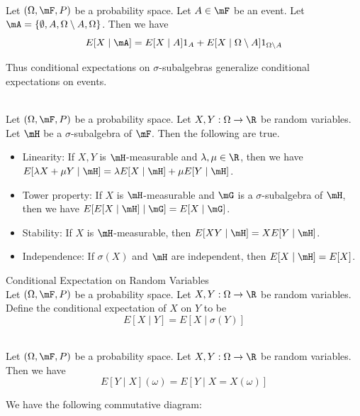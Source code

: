 \documentclass[a4paper]{article}
\begin{document}
\begin{lmm}{}{}\\
Let $(\Omega,\mF,P)$ be a probability space. Let $A\in\mF$ be an event. Let $\mA=\{\emptyset,A,\Omega\setminus A,\Omega\}$. Then we have $$E[X\;|\;\mA]=E[X\;|\;A]1_A+E[X\;|\;\Omega\setminus A]1_{\Omega\setminus A}$$
\end{lmm}

Thus conditional expectations on $\sigma$-subalgebras generalize conditional expectations on events. 

\begin{lmm}{}{}\\
Let $(\Omega,\mF,P)$ be a probability space. Let $X,Y:\Omega\to\R$ be random variables. Let $\mH$ be a $\sigma$-subalgebra of $\mF$. Then the following are true. 
\begin{itemize}
\item Linearity: If $X,Y$ is $\mH$-measurable and $\lambda,\mu\in\R$, then we have $E[\lambda X+\mu Y\;|\;\mH]=\lambda E[X\;|\;\mH]+\mu E[Y\;|\;\mH]$. 
\item Tower property: If $X$ is $\mH$-measurable and $\mG$ is a $\sigma$-subalgebra of $\mH$, then we have $E[E[X\;|\;\mH]\;|\;\mG]=E[X\;|\;\mG]$. 
\item Stability: If $X$ is $\mH$-measurable, then $E[XY\;|\;\mH]=XE[Y\;|\;\mH]$. 
\item Independence: If $\sigma(X)$ and $\mH$ are independent, then $E[X\;|\;\mH]=E[X]$. 
\end{itemize}
\end{lmm}

\begin{defn}{Conditional Expectation on Random Variables}{}\\
Let $(\Omega,\mF,P)$ be a probability space. Let $X,Y:\Omega\to\R$ be random variables. Define the conditional expectation of $X$ on $Y$ to be $$E[X\;|\;Y]=E[X\;|\;\sigma(Y)]$$
\end{defn}

\begin{lmm}{}{}\\
Let $(\Omega,\mF,P)$ be a probability space. Let $X,Y:\Omega\to\R$ be random variables. Then we have $$E[Y\;|\;X](\omega)=E[Y\;|\;X=X(\omega)]$$
\end{lmm}

We have the following commutative diagram: \\
\\
\end{document}
